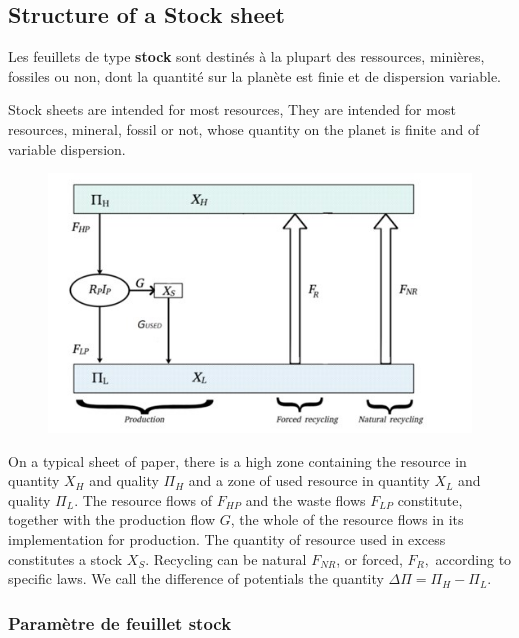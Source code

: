 \documentclass[12pt,a4paper]{article}%
\begin{document}
\subsection{Structure of a Stock sheet}

Les feuillets de type \textbf{stock} sont destinés à la plupart des ressources,
minières, fossiles ou non, dont la quantité sur la planète est finie et de dispersion variable.

Stock sheets are intended for most resources, They are intended for most resources, mineral, fossil or not, whose quantity on the planet is finite and of variable dispersion.

\begin{figure}[h]
\centering
\includegraphics[width=1.0\textwidth]{figures/FeuilleStock.jpg}\end{figure}

On a typical sheet of paper, there is a high zone containing the resource in quantity $X_{H}$ and quality $\Pi_{H}$ and a zone of used resource in quantity $X_{L}$ and quality $\Pi_{L}$. The resource flows of $F_{HP}$ and the waste flows $F_{LP}$ constitute, together with the production flow $G$, the whole of the resource flows in its implementation for production.
The quantity of resource used in excess constitutes a stock $X_{S}$. Recycling can be natural $F_{NR}$, or forced, $F_{R},$ according to specific laws. We call the difference of potentials the quantity $\Delta \Pi=\Pi_{H}-\Pi_{L}$.



\subsubsection{Paramètre de feuillet stock}
\end{document}
